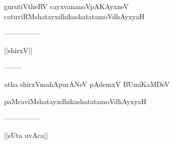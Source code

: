 \documentclass{article}
\begin{document}
\begin{center}
gurutiVtheRV cayxvananoVpAKAyxneV catuviRMshatayxdhikashatatamoVdhAyxyaH
\end{center}

\begin{center}
---------------
\end{center}

\begin{center}
||shirxV||
\end{center}

\begin{center}
--------
\end{center}

\begin{center}
atha shirxVmahApurANeV pAdemxV BUmiKaMDeV
\end{center}

\begin{center}
paMcaviMshatayxdhikashatatamoVdhAyxyaH
\end{center}

\begin{center}
---------------
\end{center}

\begin{center}
||sUta uvAca||
\end{center}
\end{document}
